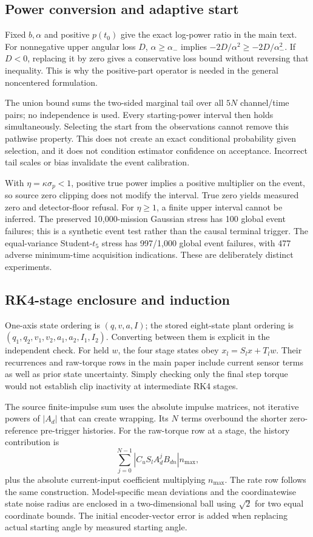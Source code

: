 \documentclass[10pt,journal]{IEEEtran}
\begin{document}
\subsection{Power conversion and adaptive start}
Fixed $b,\alpha$ and positive $p(t_0)$ give the exact log-power ratio in the main text. For nonnegative upper angular loss $D$, $\alpha\geq\alpha_-$ implies $-2D/\alpha^2\geq-2D/\alpha_-^2$. If $D<0$, replacing it by zero gives a conservative loss bound without reversing that inequality. This is why the positive-part operator is needed in the general noncentered formulation.

The union bound sums the two-sided marginal tail over all $5N$ channel/time pairs; no independence is used. Every starting-power interval then holds simultaneously. Selecting the start from the observations cannot remove this pathwise property. This does not create an exact conditional probability given selection, and it does not condition estimator confidence on acceptance. Incorrect tail scales or bias invalidate the event calibration.

With $\eta=\kappa\sigma_p<1$, positive true power implies a positive multiplier on the event, so source zero clipping does not modify the interval. True zero yields measured zero and detector-floor refusal. For $\eta\geq1$, a finite upper interval cannot be inferred. The preserved 10,000-mission Gaussian stress has 100 global event failures; this is a synthetic event test rather than the causal terminal trigger. The equal-variance Student-$t_5$ stress has 997/1,000 global event failures, with 477 adverse minimum-time acquisition indications. These are deliberately distinct experiments.

\subsection{RK4-stage enclosure and induction}
One-axis state ordering is $(q,v,a,I)$; the stored eight-state plant ordering is $(q_1,q_2,v_1,v_2,a_1,a_2,I_1,I_2)$. Converting between them is explicit in the independent check. For held $w$, the four stage states obey $x_l=S_lx+T_lw$. Their recurrences and raw-torque rows in the main paper include current sensor terms as well as prior state uncertainty. Simply checking only the final step torque would not establish clip inactivity at intermediate RK4 stages.

The source finite-impulse sum uses the absolute impulse matrices, not iterative powers of $|A_d|$ that can create wrapping. Its $N$ terms overbound the shorter zero-reference pre-trigger histories. For the raw-torque row at a stage, the history contribution is
\begin{equation}
\sum_{j=0}^{N-1}|C_uS_lA_d^jB_{dn}|n_{\max},
\end{equation}
plus the absolute current-input coefficient multiplying $n_{\max}$. The rate row follows the same construction. Model-specific mean deviations and the coordinatewise state noise radius are enclosed in a two-dimensional ball using $\sqrt2$ for two equal coordinate bounds. The initial encoder-vector error is added when replacing actual starting angle by measured starting angle.
\end{document}
